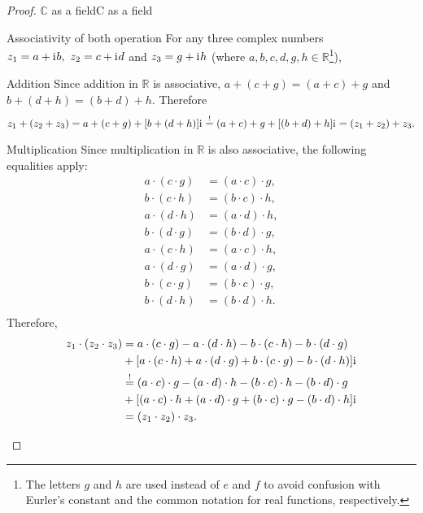 \begin{proof}{$\bm{\mathbb{C}}$ as a field}{C as a field}
\begin{descitemize}
		\item[Associativity of both operation] For any three complex numbers $z_{1}=a+\mathrm{i}\mkern1mu b,\ z_{2}=c+\mathrm{i}\mkern1mu d$ and $z_{3}=g+\mathrm{i}\mkern1mu h$ (where $a,b,c,d,g,h\in\mathbb{R}$\footnote{The letters $g$ and $h$ are used instead of $e$ and $f$ to avoid confusion with Eurler's constant and the common notation for real functions, respectively.}),
			\begin{listitemize}
			\item[Addition] Since addition in $\mathbb{R}$ is associative, $a+(c+g)=(a+c)+g$ and $b+(d+h)=(b+d)+h$. Therefore
				\[
					z_{1} + (z_{2}+z_{3}) = a+(c+g) + [b+(d+h)]\mathrm{i}\mkern1mu \overset{!}{=} (a+c)+g + [(b+d)+h]\mathrm{i}\mkern1mu = (z_{1}+z_{2}) + z_{3}.
				\]
			\item[Multiplication] Since multiplication in $\mathbb{R}$ is also associative, the following equalities apply:
				\begin{align*}
					a\cdot(c\cdot g) &= (a\cdot c)\cdot g,\\
					b\cdot(c\cdot h) &= (b\cdot c)\cdot h,\\
					a\cdot(d\cdot h) &= (a\cdot d)\cdot h,\\
					b\cdot(d\cdot g) &= (b\cdot d)\cdot g,\\
					a\cdot(c\cdot h) &= (a\cdot c)\cdot h,\\
					a\cdot(d\cdot g) &= (a\cdot d)\cdot g,\\
					b\cdot(c\cdot g) &= (b\cdot c)\cdot g,\\
					b\cdot(d\cdot h) &= (b\cdot d)\cdot h.\\
				\end{align*}
				Therefore,
				\begin{align*}
					z_{1}\cdot(z_{2} \cdot z_{3}) &= a\cdot(c\cdot g) - a\cdot(d\cdot h) - b\cdot(c\cdot h) - b\cdot(d\cdot g)\\ &+[a\cdot(c\cdot h) + a\cdot(d\cdot g) + b\cdot(c\cdot g) - b\cdot(d\cdot h)]\mathrm{i}\mkern1mu\\
					&\overset{!}{=} (a\cdot c)\cdot g - (a\cdot d)\cdot h - (b\cdot c)\cdot h - (b\cdot d)\cdot g\\ &+[(a\cdot c)\cdot h + (a\cdot d)\cdot g + (b\cdot c)\cdot g - (b\cdot d)\cdot h]\mathrm{i}\mkern1mu\\
					&= (z_{1} \cdot z_{2}) \cdot z_{3}.
				\end{align*}
			\end{listitemize}


\end{descitemize}
\end{proof}
